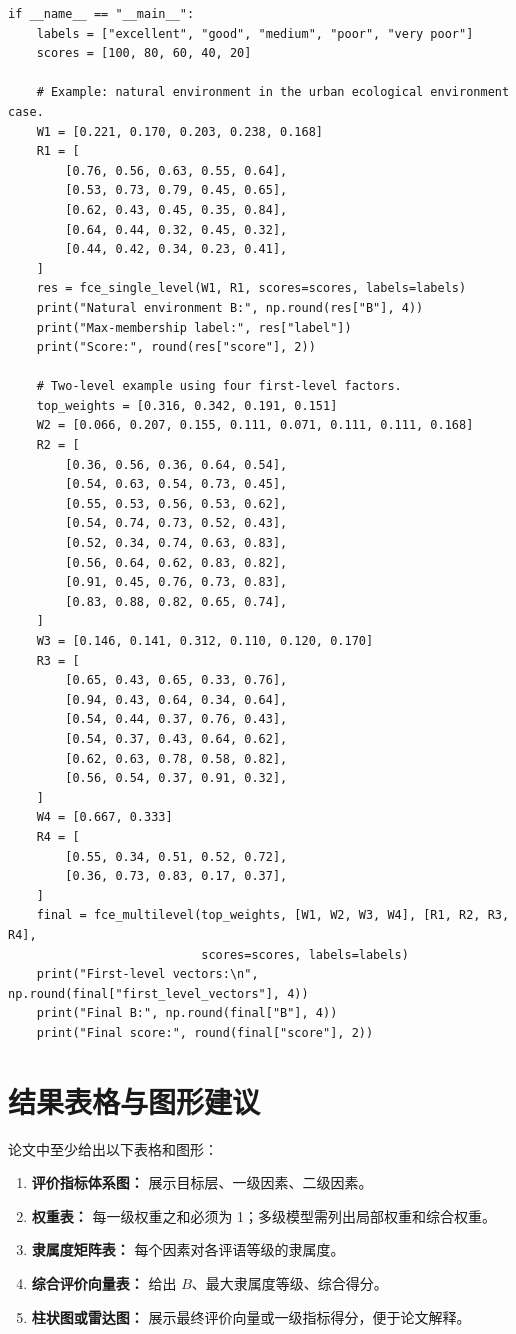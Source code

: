 \documentclass[UTF8,zihao=-4,fontset=none]{ctexart}
\begin{document}
\begin{lstlisting}
if __name__ == "__main__":
    labels = ["excellent", "good", "medium", "poor", "very poor"]
    scores = [100, 80, 60, 40, 20]

    # Example: natural environment in the urban ecological environment case.
    W1 = [0.221, 0.170, 0.203, 0.238, 0.168]
    R1 = [
        [0.76, 0.56, 0.63, 0.55, 0.64],
        [0.53, 0.73, 0.79, 0.45, 0.65],
        [0.62, 0.43, 0.45, 0.35, 0.84],
        [0.64, 0.44, 0.32, 0.45, 0.32],
        [0.44, 0.42, 0.34, 0.23, 0.41],
    ]
    res = fce_single_level(W1, R1, scores=scores, labels=labels)
    print("Natural environment B:", np.round(res["B"], 4))
    print("Max-membership label:", res["label"])
    print("Score:", round(res["score"], 2))

    # Two-level example using four first-level factors.
    top_weights = [0.316, 0.342, 0.191, 0.151]
    W2 = [0.066, 0.207, 0.155, 0.111, 0.071, 0.111, 0.111, 0.168]
    R2 = [
        [0.36, 0.56, 0.36, 0.64, 0.54],
        [0.54, 0.63, 0.54, 0.73, 0.45],
        [0.55, 0.53, 0.56, 0.53, 0.62],
        [0.54, 0.74, 0.73, 0.52, 0.43],
        [0.52, 0.34, 0.74, 0.63, 0.83],
        [0.56, 0.64, 0.62, 0.83, 0.82],
        [0.91, 0.45, 0.76, 0.73, 0.83],
        [0.83, 0.88, 0.82, 0.65, 0.74],
    ]
    W3 = [0.146, 0.141, 0.312, 0.110, 0.120, 0.170]
    R3 = [
        [0.65, 0.43, 0.65, 0.33, 0.76],
        [0.94, 0.43, 0.64, 0.34, 0.64],
        [0.54, 0.44, 0.37, 0.76, 0.43],
        [0.54, 0.37, 0.43, 0.64, 0.62],
        [0.62, 0.63, 0.78, 0.58, 0.82],
        [0.56, 0.54, 0.37, 0.91, 0.32],
    ]
    W4 = [0.667, 0.333]
    R4 = [
        [0.55, 0.34, 0.51, 0.52, 0.72],
        [0.36, 0.73, 0.83, 0.17, 0.37],
    ]
    final = fce_multilevel(top_weights, [W1, W2, W3, W4], [R1, R2, R3, R4],
                           scores=scores, labels=labels)
    print("First-level vectors:\n", np.round(final["first_level_vectors"], 4))
    print("Final B:", np.round(final["B"], 4))
    print("Final score:", round(final["score"], 2))
\end{lstlisting}

\section{结果表格与图形建议}
论文中至少给出以下表格和图形：
\begin{enumerate}[leftmargin=2.2em]
  \item \textbf{评价指标体系图：} 展示目标层、一级因素、二级因素。
  \item \textbf{权重表：} 每一级权重之和必须为 1；多级模型需列出局部权重和综合权重。
  \item \textbf{隶属度矩阵表：} 每个因素对各评语等级的隶属度。
  \item \textbf{综合评价向量表：} 给出 $B$、最大隶属度等级、综合得分。
  \item \textbf{柱状图或雷达图：} 展示最终评价向量或一级指标得分，便于论文解释。
\end{enumerate}
\end{document}
